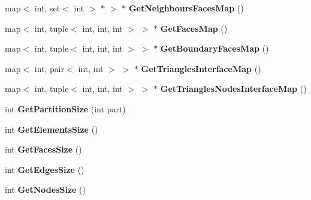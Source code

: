 \begin{DoxyCompactItemize}
\item 
map$<$ int, set$<$ int $>$ $\ast$ $>$ $\ast$ {\bfseries Get\+Neighbours\+Faces\+Map} ()\hypertarget{class_maillage3_d_a66c77483c54d224a33d18f94a6358c21}{}\label{class_maillage3_d_a66c77483c54d224a33d18f94a6358c21}

\item 
map$<$ int, tuple$<$ int, int, int $>$ $>$ $\ast$ {\bfseries Get\+Faces\+Map} ()\hypertarget{class_maillage3_d_ad025d923936e118f28f58da6678b68a5}{}\label{class_maillage3_d_ad025d923936e118f28f58da6678b68a5}

\item 
map$<$ int, tuple$<$ int, int, int $>$ $>$ $\ast$ {\bfseries Get\+Boundary\+Faces\+Map} ()\hypertarget{class_maillage3_d_a17c2008e3ce49edbb663b4e94a128a5e}{}\label{class_maillage3_d_a17c2008e3ce49edbb663b4e94a128a5e}

\item 
map$<$ int, pair$<$ int, int $>$ $>$ $\ast$ {\bfseries Get\+Triangles\+Interface\+Map} ()\hypertarget{class_maillage3_d_a8579c71a9e0416421a82ea67c5cf2adb}{}\label{class_maillage3_d_a8579c71a9e0416421a82ea67c5cf2adb}

\item 
map$<$ int, tuple$<$ int, int, int $>$ $>$ $\ast$ {\bfseries Get\+Triangles\+Nodes\+Interface\+Map} ()\hypertarget{class_maillage3_d_a48acf283b9bebf3c1c618a7337f279e1}{}\label{class_maillage3_d_a48acf283b9bebf3c1c618a7337f279e1}

\item 
int {\bfseries Get\+Partition\+Size} (int part)\hypertarget{class_maillage3_d_a345cbc564a1653bead5a2508b1b1b132}{}\label{class_maillage3_d_a345cbc564a1653bead5a2508b1b1b132}

\item 
int {\bfseries Get\+Elements\+Size} ()\hypertarget{class_maillage3_d_a0e71069f7b043621238c72167ef1fa2b}{}\label{class_maillage3_d_a0e71069f7b043621238c72167ef1fa2b}

\item 
int {\bfseries Get\+Faces\+Size} ()\hypertarget{class_maillage3_d_aa901d66f5755580392f62a38531552fe}{}\label{class_maillage3_d_aa901d66f5755580392f62a38531552fe}

\item 
int {\bfseries Get\+Edges\+Size} ()\hypertarget{class_maillage3_d_a1fc61fb4772dc1351615be462ef9c057}{}\label{class_maillage3_d_a1fc61fb4772dc1351615be462ef9c057}

\item 
int {\bfseries Get\+Nodes\+Size} ()\hypertarget{class_maillage3_d_a3e4211e571e2bfeb5b71527b1eb90f9f}{}\label{class_maillage3_d_a3e4211e571e2bfeb5b71527b1eb90f9f}


\end{DoxyCompactItemize}
